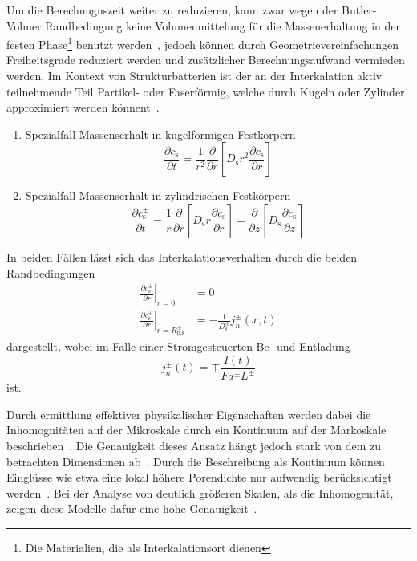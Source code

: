 Um die Berechnugnszeit weiter zu reduzieren, kann zwar wegen der Butler-Volmer Randbedingung keine Volumenmittelung für die Massenerhaltung in der festen Phase\footnote{Die Materialien, die als Interkalationsort dienen} benutzt werden~\cite{Plett2015}, jedoch können durch Geometrievereinfachungen Freiheitsgrade reduziert werden und zusätzlicher Berechnungsaufwand vermieden werden. Im Kontext von Strukturbatterien ist der an der Interkalation aktiv teilnehmende Teil Partikel- oder Faserförmig, welche durch Kugeln oder Zylinder approximiert werden könnent~\cite{Newman2021}.
\begin{enumerate}
    \item Spezialfall Massenserhalt in kugelförmigen Festkörpern
    \begin{equation}
    \frac{\partial c_{\text{s}}}{\partial t} = \frac{1}{r^2} \frac{\partial}{ \partial r} \left[ D_{\text{s}} r^2 \frac{\partial c_{\text{s}}}{\partial r}\right]
    \end{equation}
    \item Spezialfall Massenserhalt in zylindrischen Festkörpern
    \begin{equation}
    \frac{\partial c_{\text{s}}^{\pm}}{\partial t} = \frac{1}{r} \frac{\partial}{ \partial r} \left[ D_{\text{s}} r \frac{\partial c_{\text{s}}}{\partial r}\right] + \frac{\partial}{ \partial z}\left[D_{\text{s}}  \frac{\partial c_{\text{s}}}{\partial z}\right]
    \end{equation}
\end{enumerate}
In beiden Fällen lässt sich das Interkalationsverhalten durch die beiden Randbedingungen
\begin{align}
    \left.\frac{\partial c_{\text{s}}^{\pm}}{\partial r}\right\vert_{r=0} &= 0 \\
    \left.\frac{\partial c_{\text{s}}^{\pm}}{\partial r}\right\vert_{r=R_{\text{p,s}}^{\pm}} &= -\frac{1}{ D_{\text{s}}^\pm} j_{n}^{\pm}(x,t)
\end{align}
dargestellt, wobei im Falle einer Stromgesteuerten Be- und Entladung
\begin{equation}
j_{n}^{\pm}(t) = \mp \frac{I(t)}{F a^{\pm} L^{\pm}}
\end{equation}
ist.

Durch ermittlung effektiver physikalischer Eigenschaften werden dabei die Inhomognitäten auf der Mikroskale durch ein Kontinuum auf der Markoskale beschrieben~\cite{Plett2024}. Die Genauigkeit dieses Ansatz hängt jedoch stark von dem zu betrachten Dimensionen ab~\cite{Plett2015}. Durch die Beschreibung als Kontinuum können Einglüsse wie etwa eine lokal höhere Porendichte nur aufwendig berücksichtigt werden~\cite{Mei2019}. Bei der Analyse von deutlich größeren Skalen, als die Inhomogenität, zeigen diese Modelle dafür eine hohe Genauigkeit~\cite{Plett2015}. 



